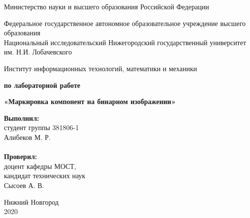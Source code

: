 \documentclass{report}
\begin{document}
	\begin{titlepage}

		\begin{center}
			Министерство науки и высшего образования Российской Федерации
		\end{center}

		\begin{center}
			Федеральное государственное автономное образовательное учреждение высшего образования \\
			Национальный исследовательский Нижегородский государственный университет им. Н.И. Лобачевского
		\end{center}

		\begin{center}
			Институт информационных технологий, математики и механики
		\end{center}

		\vspace{4em}

		\begin{center}
			\textbf{ по лабораторной работе} \\
		\end{center}
		\begin{center}
			\textbf{\Large«Маркировка компонент на бинарном изображении»} \\
		\end{center}

		\vspace{4em}

		\newbox{\lbox}
		\newlength{\maxl}
		\setlength{\maxl}{\wd\lbox}
		\hfill\parbox{7cm}{
			\hspace*{5cm}\hspace*{-5cm}\textbf{Выполнил:} \\ студент группы 381806-1 \\ Алибеков М. Р.\\
			\\
			\hspace*{5cm}\hspace*{-5cm}\textbf{Проверил:}\\ доцент кафедры МОСТ, \\ кандидат технических наук \\ Сысоев А. В.\\
		}
		\vspace{\fill}

		\begin{center} Нижний Новгород \\ 2020 \end{center}

	\end{titlepage}
\end{document}
